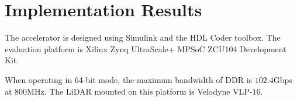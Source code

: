 \documentclass[conference]{IEEEtran}
\begin{document}
\begin{comment}
A multiplexer between buffers and PE array determines what data will be fed into PE array. The candidates are: 1) feature map from DDR, 2) feature map after max pooling and 3) partial sum from output/intermediate buffer during matrix multiplication. In case of partial sum, the accumulated sum in output buffer is read back to sum with partial sum in adder array after PE.  \textcolor{blue}{more descriptions on setting parameters} When working, Finite State Machine (FSM) reads these parameters from register file and determines the buffer read/write, output of multiplexers and so on. Using register file speeds up the processing speed because there is no need to configure accelerator via slow AXI-lite operation before reading stream data from DDR.
\end{comment}

\begin{comment}
\textcolor{blue}{In PointNet, max pooling is used to find out the largest value in each column, while the PE outputs matrix one row after another. More importantly, the number of point in input point clouds varies. All of these make the max pooling purely in Programmable Logic (PL) side inefficient. Therefore, a software/hardware co-design way is utilized, where max pooling is divided into two steps for PS side and PL side separately. First, ARM in PS side fetches the row oriented matrix and stores it back after doing transpose. And then, accelerator fetches this transposed matrix to the compactor array in Max Pooling block in Fig.~\ref{fig:point_hw_arch} in a stream way. The benefit this design are avoiding large on-chip resources consumed on matrix reforming or serial to parallel converter, and adapting to any size of input point cloud. The processing speed of matrix transpose in ARM versus matrix size is summarized in Tab.~\ref{tab:matrix_t}.}
\end{comment}

\section{Implementation Results}\label{sec:result}
The accelerator is designed using Simulink and the HDL Coder toolbox. The evaluation platform is Xilinx Zynq UltraScale+ MPSoC ZCU104 Development Kit. 
\begin{comment}
\textcolor{blue}{, whose PS is equipped with a quad-core ARM Cortex-A53 processor and a dual-core ARM Cortex-R5 processor. On the PL side, there are $460'800$ FFs (Flip-Flops), $230'400$ LUTs (Look-Up Tables), $38$Mbit on-chip RAMs and $1'728$ DSP slices.} 
\end{comment}
When operating in 64-bit mode, the maximum bandwidth of DDR is $102.4$Gbps at $800$MHz. The LiDAR mounted on this platform is Velodyne VLP-16.
\end{document}
